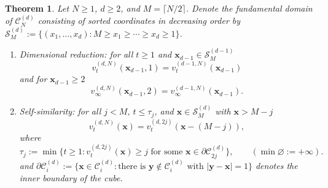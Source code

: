 \documentclass[12pt]{amsart}
\newtheorem{theorem}{Theorem}[section]
\begin{document}
	
	\begin{theorem}\label{the_theorem}
		Let $N \geq 1$, $d \geq 2$, and $M = \lceil N/2 \rceil$. Denote the fundamental domain of $\mathcal{C}_N^{(d)}$
		consisting of sorted coordinates in decreasing order by $\mathcal{S}^{(d)}_M := \{ (x_1, \ldots, x_d): M \geq x_1 \geq \cdots \geq x_d \geq 1 \}$.
		
		\begin{enumerate}
			\item{Dimensional reduction:} for all $t \geq 1$ and $\mathbf{x}_{d-1} \in \mathcal{S}_M^{(d-1)}$
			\begin{equation*}
			v_t^{(d, N)}(\mathbf{x}_{d-1}, 1) =  v_t^{(d-1, N)}(\mathbf{x}_{d-1})
			\end{equation*}
			and for $\mathbf{x}_{d-1} \geq 2$ 
			\begin{equation*}
			v_{\infty}^{(d,N)}(\mathbf{x}_{d-1}, 2) =  v_{\infty}^{(d-1,N)}(\mathbf{x}_{d-1}).
			\end{equation*}
			\item{Self-similarity:} for all $j < M$, $t \leq \tau_j$, and $\mathbf{x} \in \mathcal{S}_M^{(d)}$ with $\mathbf{x} > M-j$
			\begin{equation*}
			v_t^{(d, N)}(\mathbf{x}) = v_t^{(d, 2 j)}(\mathbf{x}-(M-j)),
			\end{equation*}
			where 
			\begin{equation*}
			\tau_{j} := \min\{ t \geq 1: v_t^{(d,2 j)}(\mathbf{x}) \geq j
                \mbox{ for some $\mathbf{x}\in\partial\mathcal{C}^{(d)}_{2j}$}\},
                \qquad(\min\varnothing:=+\infty).
			\end{equation*}
			and $\partial \mathcal{C}^{(d)}_i := \{ \mathbf{x} \in \mathcal{C}^{(d)}_i : \mbox{there is $\mathbf{y} \not \in \mathcal{C}^{(d)}_i$ with $|\mathbf{y}-\mathbf{x|} = 1$}\}$ denotes the inner boundary of the cube.
			
		\end{enumerate}
		
		
		
	\end{theorem} 
\end{document}
